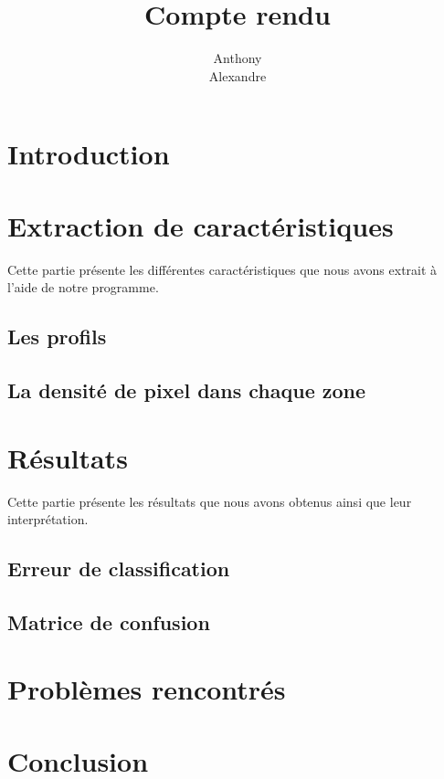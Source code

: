 \documentclass{scrreprt}
\title{Compte rendu}
\author{ 
	Anthony \bsc{Courtin} \\
	Alexandre \bsc{Hottin}}
\begin{document}

\tableofcontents

\chapter{Introduction}


\chapter{Extraction de caractéristiques}
Cette partie présente les différentes caractéristiques que nous avons extrait à l'aide de notre programme.

\section{Les profils}
\section{La densité de pixel dans chaque zone}

\chapter{Résultats}
Cette partie présente les résultats que nous avons obtenus ainsi que leur interprétation.

\section{Erreur de classification}
\section{Matrice de confusion}

\chapter{Problèmes rencontrés}
\chapter{Conclusion}


\end{document}
